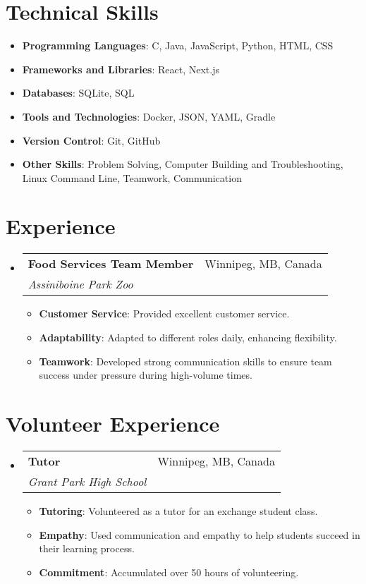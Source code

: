 \documentclass[letterpaper,11pt]{article}
\makeatletter
\newcommand{\resumeItem}[2]{
  \item\small{
    \textbf{#1}{: #2 \vspace{-2pt}}
  }
}
\newcommand{\resumeSubheading}[4]{
  \vspace{-1pt}\item
    \begin{tabular*}{0.97\textwidth}[t]{l@{\extracolsep{\fill}}r}
      \textbf{#1} & #2 \\
      \textit{\small#3} & \textit{\small#4} \\
    \end{tabular*}\vspace{-5pt}
}
\newcommand{\resumeSubHeadingListStart}{\begin{itemize}[leftmargin=*]}
\newcommand{\resumeSubHeadingListEnd}{\end{itemize}}
\newcommand{\resumeItemListStart}{\begin{itemize}}
\newcommand{\resumeItemListEnd}{\end{itemize}\vspace{-5pt}}
\makeatother
\begin{document}
\section{Technical Skills}
  \resumeSubHeadingListStart
    \resumeItem{Programming Languages}{C, Java, JavaScript, Python, HTML, CSS}
    \resumeItem{Frameworks and Libraries}{React, Next.js}
    \resumeItem{Databases}{SQLite, SQL}
    \resumeItem{Tools and Technologies}{Docker, JSON, YAML, Gradle}
    \resumeItem{Version Control}{Git, GitHub}
    \resumeItem{Other Skills}{Problem Solving, Computer Building and Troubleshooting, Linux Command Line, Teamwork, Communication}
  \resumeSubHeadingListEnd

\section{Experience}
  \resumeSubHeadingListStart
    \resumeSubheading
      {Food Services Team Member}{Winnipeg, MB, Canada}
      {Assiniboine Park Zoo}{}
      \resumeItemListStart
        \resumeItem{Customer Service}{Provided excellent customer service.}
        \resumeItem{Adaptability}{Adapted to different roles daily, enhancing flexibility.}
        \resumeItem{Teamwork}{Developed strong communication skills to ensure team success under pressure during high-volume times.}
      \resumeItemListEnd
  \resumeSubHeadingListEnd

\section{Volunteer Experience}
  \resumeSubHeadingListStart
    \resumeSubheading
      {Tutor}{Winnipeg, MB, Canada}
      {Grant Park High School}{}
      \resumeItemListStart
        \resumeItem{Tutoring}{Volunteered as a tutor for an exchange student class.}
        \resumeItem{Empathy}{Used communication and empathy to help students succeed in their learning process.}
        \resumeItem{Commitment}{Accumulated over 50 hours of volunteering.}
      \resumeItemListEnd
  \resumeSubHeadingListEnd

\end{document}
